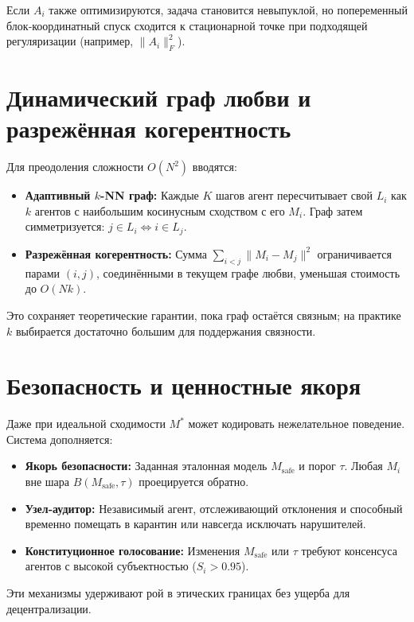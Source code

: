 \documentclass{article}
\begin{document}
Если $A_i$ также оптимизируются, задача становится невыпуклой, но попеременный блок‑координатный спуск сходится к стационарной точке при подходящей регуляризации (например, $\|A_i\|_F^2$).

\section{Динамический граф любви и разрежённая когерентность}
Для преодоления сложности $O(N^2)$ вводятся:
\begin{itemize}
    \item \textbf{Адаптивный $k$-NN граф:} Каждые $K$ шагов агент пересчитывает свой $L_i$ как $k$ агентов с наибольшим косинусным сходством с его $M_i$. Граф затем симметризуется: $j\in L_i \iff i\in L_j$.
    \item \textbf{Разрежённая когерентность:} Сумма $\sum_{i<j}\|M_i-M_j\|^2$ ограничивается парами $(i,j)$, соединёнными в текущем графе любви, уменьшая стоимость до $O(Nk)$.
\end{itemize}
Это сохраняет теоретические гарантии, пока граф остаётся связным; на практике $k$ выбирается достаточно большим для поддержания связности.

\section{Безопасность и ценностные якоря}
Даже при идеальной сходимости $M^*$ может кодировать нежелательное поведение. Система дополняется:
\begin{itemize}
    \item \textbf{Якорь безопасности:} Заданная эталонная модель $M_{\text{safe}}$ и порог $\tau$. Любая $M_i$ вне шара $B(M_{\text{safe}},\tau)$ проецируется обратно.
    \item \textbf{Узел‑аудитор:} Независимый агент, отслеживающий отклонения и способный временно помещать в карантин или навсегда исключать нарушителей.
    \item \textbf{Конституционное голосование:} Изменения $M_{\text{safe}}$ или $\tau$ требуют консенсуса агентов с высокой субъектностью ($S_i > 0.95$).
\end{itemize}
Эти механизмы удерживают рой в этических границах без ущерба для децентрализации.
\end{document}
